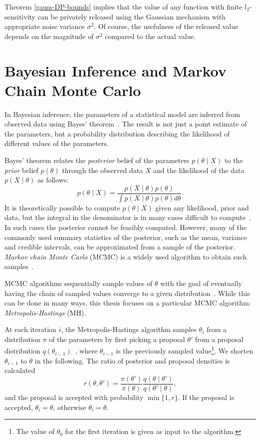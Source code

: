 \documentclass[english,twoside,openright]{HYgraduMLDS}
\begin{document}
Theorem \ref{gauss-DP-bounds} implies that the value of any function with 
finite \(l_2\)-sensitivity can be privately released using the Gaussian mechanism 
with appropriate noise variance \(\sigma^2\). Of course, the usefulness of the 
released value depends on the magnitude of \(\sigma^2\) compared to the actual 
value.

\section{Bayesian Inference and Markov Chain Monte Carlo}\label{MCMC_background}

In Bayesian inference, the parameters of a statistical model are inferred from 
observed data using Bayes' theorem~\cite{BDA}. The result is not just a point estimate 
of the parameters, but a probability distribution describing the likelihood 
of different values of the parameters.

Bayes' theorem relates the \emph{posterior} belief of the parameters 
\(p(\theta \mid X)\) to the \emph{prior} belief \(p(\theta)\) through the 
observed data \(X\) and the likelihood of the data \(p(X\mid \theta)\) as follows:
\[
    p(\theta \mid X) = \frac{p(X \mid \theta)p(\theta)}
    {\int p(X\mid \theta)p(\theta)d\theta}.
\]
It is theoretically possible to compute \(p(\theta \mid X)\) given any 
likelihood, prior and data, but the integral in the denominator is in many 
cases difficult to compute~\cite{BDA}. In such cases the posterior cannot be feasibly 
computed. However, many of the commonly used summary statistics of the posterior, 
such as the mean, variance and credible intervals, can be approximated from 
a sample of the posterior. \emph{Markov chain Monte Carlo} (MCMC) is a 
widely used algorithm to obtain such samples~\cite{BDA}.

MCMC algorithms sequentially sample values of \(\theta\)
with the goal of eventually having the chain of sampled values converge to 
a given distribution~\cite{BDA}. While this can be done in many ways, this thesis 
focuses on a particular MCMC algorithm: \emph{Metropolis-Hastings} (MH).

At each iteration \(i\), the Metropolis-Hastings algorithm samples \(\theta_i\) 
from a distribution \(\pi\) of the parameters
by first picking a proposal \(\theta'\) from a proposal 
distribution \(q(\theta_{i-1})\)~\cite{BDA}, where \(\theta_{i-1}\) is the 
previously sampled value\footnote{
    The value of \(\theta_0\) for the first iteration is given as input to the 
    algorithm.
}. We shorten \(\theta_{i-1}\) to \(\theta\) in the following. 
The ratio of posterior and proposal densities is calculated
\[
    r(\theta, \theta') = \frac{\pi(\theta')}{\pi(\theta)}
    \frac{q(\theta\mid \theta')}{q(\theta'\mid \theta)},
\]
and the proposal is accepted with probability \(\min\{1, r\}\). 
If the proposal is accepted, 
\(\theta_i = \theta\), otherwise \(\theta_i = \theta\).
\end{document}
